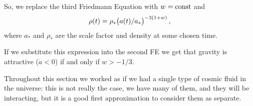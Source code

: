 \documentclass[main.tex]{subfiles}
\begin{document}








So, we replace the third Friedmann Equation with \(w = \text{const}\) and 
%
\begin{align}
  \rho(t) = \rho_{*} \qty(a(t) / a_{*})^{-3(1+w)} 
\,,
\end{align}
%
where \(a_{*}\) and \(\rho_{*} \) are the scale factor and density at some chosen time.

If we substitute this expression into the second FE we get that gravity is attractive (\(\ddot{a} < 0 \)) if and only if \(w > -1/3\). 

Throughout this section we worked as if we had a single type of cosmic fluid in the universe: this is not really the case, we have many of them, and they will be interacting, but it is a good first approximation to consider them as separate.  
\end{document}
